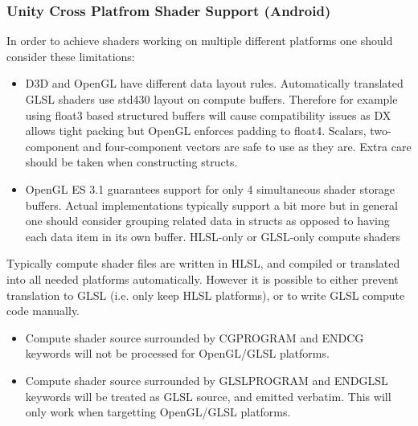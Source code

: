 \documentclass[a4paper,10pt]{article}
\begin{document}
\subsubsection{Unity Cross Platfrom Shader Support (Android)}
In order to achieve shaders working on multiple different platforms one should consider these limitations:

\begin{itemize}
\item 
D3D and OpenGL have different data layout rules. Automatically translated GLSL shaders use std430 layout on compute buffers. Therefore for example using float3 based structured buffers will cause compatibility issues as DX allows tight packing but OpenGL enforces padding to float4. Scalars, two-component and four-component vectors are safe to use as they are. Extra care should be taken when constructing structs.
\item 
OpenGL ES 3.1 guarantees support for only 4 simultaneous shader storage buffers. Actual implementations typically support a bit more but in general one should consider grouping related data in structs as opposed to having each data item in its own buffer.
HLSL-only or GLSL-only compute shaders

\end{itemize}

Typically compute shader files are written in HLSL, and compiled or translated into all needed platforms automatically. However it is possible to either prevent translation to GLSL (i.e. only keep HLSL platforms), or to write GLSL compute code manually.
\begin{itemize}
\item Compute shader source surrounded by CGPROGRAM and ENDCG keywords will not be processed for OpenGL/GLSL platforms.
\item Compute shader source surrounded by GLSLPROGRAM and ENDGLSL keywords will be treated as GLSL source, and emitted verbatim. This will only work when targetting OpenGL/GLSL platforms.
\end{itemize}
\pagebreak
\end{document}
